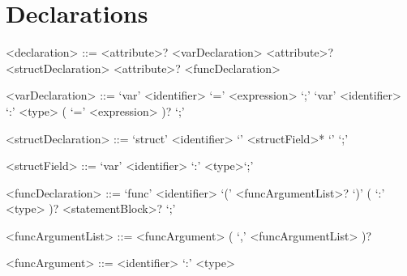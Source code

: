 \section{Declarations}

\setlength{\grammarparsep}{20pt plus 1pt minus 1pt}
\setlength{\grammarindent}{10em}
\begin{grammar}

<declaration> ::= <attribute>? <varDeclaration>
\alt <attribute>? <structDeclaration>
\alt <attribute>? <funcDeclaration>

<varDeclaration> ::= `var' <identifier> `=' <expression> `;'
\alt `var' <identifier> `:' <type> ( `=' <expression> )? `;'

<structDeclaration> ::= `struct' <identifier> `{' <structField>* `}' `;'

<structField> ::= `var' <identifier> `:' <type>`;'

<funcDeclaration> ::= `func' <identifier> `(' <funcArgumentList>? `)' ( `:' <type> )? <statementBlock>? `;'

<funcArgumentList> ::= <funcArgument> ( `,' <funcArgumentList> )?

<funcArgument> ::= <identifier> `:' <type>

\end{grammar}
